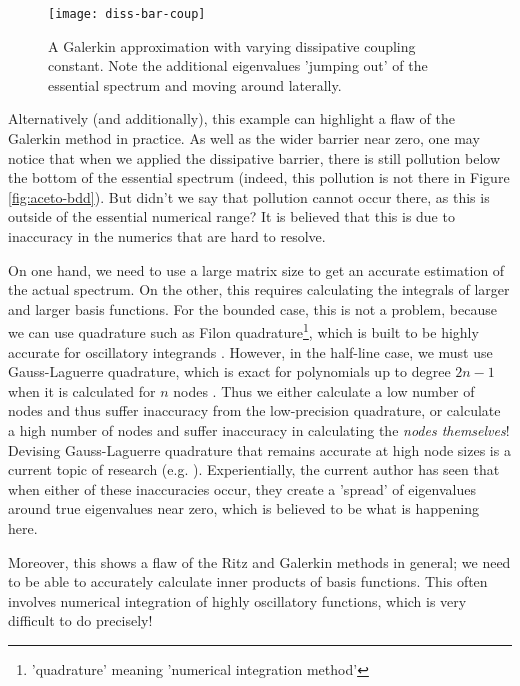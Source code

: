 \documentclass[../main.tex]{subfiles}
\begin{document}
\begin{figure}[p!]
  \centering
  \texttt{[image: diss-bar-coup]}
  \caption{A Galerkin approximation with varying dissipative coupling constant.
  Note the additional eigenvalues 'jumping out' of the essential spectrum and
  moving around laterally.}
  \label{fig:dbm-coup}
\end{figure}
\clearpage

Alternatively (and additionally), this example can highlight
a flaw of the Galerkin method in practice. As well as the wider barrier near zero,
one may notice that when we applied the dissipative barrier,
there is still pollution below the bottom of the essential spectrum (indeed, this pollution
is not there in Figure \ref{fig:aceto-bdd}). But didn't we say that pollution cannot occur there,
as this is outside of the essential numerical range? It is believed that this is due to inaccuracy
in the numerics that are hard to resolve. 

On one hand, we need to use a large matrix size to
get an accurate estimation of the actual spectrum. On the other, this requires calculating
the integrals of larger and larger basis functions. For the bounded case, this is not a problem,
because we can use quadrature such as Filon quadrature\footnote{'quadrature' meaning 'numerical
integration method'}, which is built to be highly accurate
for oscillatory integrands \cite{chase1969algorithm}. However, in the half-line case, we must
use Gauss-Laguerre quadrature, which is exact for polynomials up to degree $2n-1$ when it is
calculated for $n$ nodes \cite{suli2003introduction}. Thus we either calculate a low number
of nodes and thus suffer inaccuracy from the low-precision quadrature, or calculate a high
number of nodes and suffer inaccuracy in calculating the \emph{nodes themselves}! Devising
Gauss-Laguerre quadrature that remains accurate at high node sizes is a current topic of
research (e.g. \cite{gil2019fast}). Experientially, the current author has seen that when either of
these inaccuracies occur, they create a 'spread' of eigenvalues around true eigenvalues
near zero, which is believed to be what is happening here.

Moreover, this shows a flaw of the Ritz and Galerkin methods in general; we need to be able to
accurately calculate inner products of basis functions. This often involves numerical integration
of highly oscillatory functions, which is very difficult to do precisely!
\end{document}
